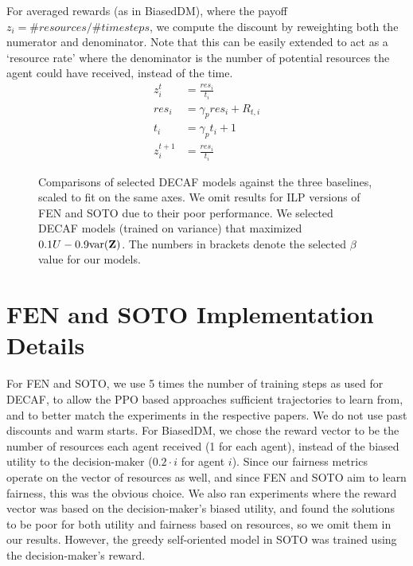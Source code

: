 For averaged rewards (as in BiasedDM), where the payoff $z_i= {\#resources}/{\#timesteps}$, we compute the discount by reweighting both the numerator and denominator. Note that this can be easily extended to act as a `resource rate' where the denominator is the number of potential resources the agent could have received, instead of the time.
\begin{align*}
    z_i^t &= \frac{res_i}{t_i}\\
    res_i &= \gamma_p res_i + R_{t,i} \\
    t_i &= \gamma_p t_i + 1 \\
    z_i^{t+1} &= \frac{res_i}{t_i}
\end{align*}


\begin{figure*}[t]
    \centering
    
    \caption{Comparisons of selected DECAF models against the three baselines, scaled to fit on the same axes. We omit results for ILP versions of FEN and SOTO due to their poor performance. We selected DECAF models (trained on variance) that maximized $0.1 U - 0.9\text{var}(\textbf{Z})$. The numbers in brackets denote the selected $\beta$ value for our models.}
    \label{fig:all_barplots}
\end{figure*}

\section{FEN and SOTO Implementation Details}
For FEN and SOTO, we use 5 times the number of training steps as used for DECAF, to allow the PPO based approaches sufficient trajectories to learn from, and to better match the experiments in the respective papers. We do not use past discounts and warm starts.
For BiasedDM, we chose the reward vector to be the number of resources each agent received (1 for each agent), instead of the biased utility to the decision-maker ($0.2\cdot i$ for agent $i$). Since our fairness metrics operate on the vector of resources as well, and since FEN and SOTO aim to learn fairness, this was the obvious choice. We also ran experiments where the reward vector was based on the decision-maker's biased utility, and found the solutions to be poor for both utility and fairness based on resources, so we omit them in our results. However, the greedy self-oriented model in SOTO was trained using the decision-maker's reward.


